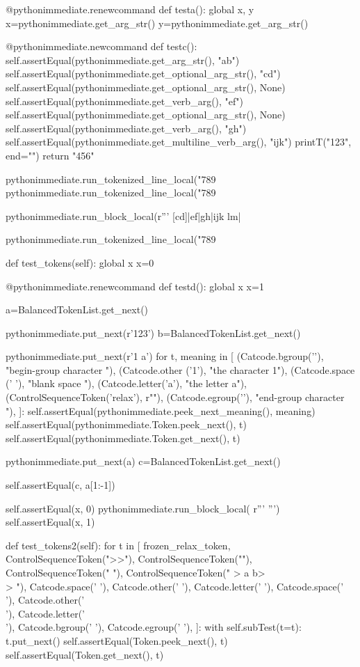 \documentclass[a5paper]{article}
\begin{document}
\begin{pycode}
		@pythonimmediate.renewcommand
		def testa():
			global x, y
			x=pythonimmediate.get_arg_str()
			y=pythonimmediate.get_arg_str()

		@pythonimmediate.newcommand
		def testc():
			self.assertEqual(pythonimmediate.get_arg_str(), "ab")
			self.assertEqual(pythonimmediate.get_optional_arg_str(), "cd")
			self.assertEqual(pythonimmediate.get_optional_arg_str(), None)
			self.assertEqual(pythonimmediate.get_verb_arg(), "ef")
			self.assertEqual(pythonimmediate.get_optional_arg_str(), None)
			self.assertEqual(pythonimmediate.get_verb_arg(), "gh")
			self.assertEqual(pythonimmediate.get_multiline_verb_arg(), "ijk\nlm")
			printT("123", end="")
			return "456"

		pythonimmediate.run_tokenized_line_local("789%
		pythonimmediate.run_tokenized_line_local("789%

		pythonimmediate.run_block_local(r''' [cd]|ef|{gh}|ijk
		lm|%

		pythonimmediate.run_tokenized_line_local("789%


	def test_tokens(self):
		global x
		x=0

		@pythonimmediate.renewcommand
		def testd():
			global x
			x=1

			a=BalancedTokenList.get_next()

			pythonimmediate.put_next(r'{123}')
			b=BalancedTokenList.get_next()

			pythonimmediate.put_next(r'{1 a\relax}')
			for t, meaning in [
					(Catcode.bgroup('{'), "begin-group character {"),
					(Catcode.other ('1'), "the character 1"),
					(Catcode.space (' '), "blank space  "),
					(Catcode.letter('a'), "the letter a"),
					(ControlSequenceToken('relax'), r"\relax"),
					(Catcode.egroup('}'), "end-group character }"),
					]:
				self.assertEqual(pythonimmediate.peek_next_meaning(), meaning)
				self.assertEqual(pythonimmediate.Token.peek_next(), t)
				self.assertEqual(pythonimmediate.Token.get_next(), t)


			pythonimmediate.put_next(a)
			c=BalancedTokenList.get_next()

			self.assertEqual(c, a[1:-1])


		self.assertEqual(x, 0)
		pythonimmediate.run_block_local(
		r'''
		''')
		self.assertEqual(x, 1)

	def test_tokens2(self):
		for t in [
				frozen_relax_token,
				ControlSequenceToken(">>"),
				ControlSequenceToken(""),
				ControlSequenceToken("  "),
				ControlSequenceToken(" > a b>\\> "),
				Catcode.space(' '),
				Catcode.other(' '),
				Catcode.letter(' '),
				Catcode.space('\\'),
				Catcode.other('\\'),
				Catcode.letter('\\'),
				Catcode.bgroup(' '),
				Catcode.egroup(' '),
				]:
			with self.subTest(t=t):
				t.put_next()
				self.assertEqual(Token.peek_next(), t)
				self.assertEqual(Token.get_next(), t)


\end{pycode}
\end{document}
